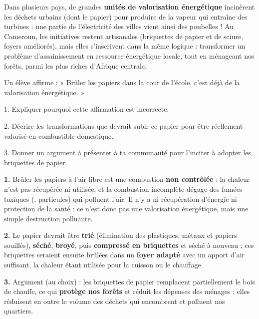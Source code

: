 \documentclass[11pt]{article}
\begin{document}
\begin{savaistu}
Dans plusieurs pays, de grandes \textbf{unités de valorisation énergétique} incinèrent les déchets urbains (dont le papier) pour produire de la vapeur qui entraîne des turbines : une partie de l'électricité des villes vient ainsi des poubelles ! Au Cameroun, les initiatives restent artisanales (briquettes de papier et de sciure, foyers améliorés), mais elles s'inscrivent dans la même logique : transformer un problème d'assainissement en ressource énergétique locale, tout en ménageant nos forêts, parmi les plus riches d'Afrique centrale.
\end{savaistu}

\begin{exercice}
Un élève affirme : « Brûler les papiers dans la cour de l'école, c'est déjà de la valorisation énergétique. »

1. Expliquer pourquoi cette affirmation est incorrecte.

2. Décrire les transformations que devrait subir ce papier pour être réellement valorisé en combustible domestique.

3. Donner un argument à présenter à ta communauté pour l'inciter à adopter les briquettes de papier.
\end{exercice}

\begin{corrige}
\textbf{1.} Brûler les papiers à l'air libre est une combustion \textbf{non contrôlée} : la chaleur n'est pas récupérée ni utilisée, et la combustion incomplète dégage des fumées toxiques (, particules) qui polluent l'air. Il n'y a ni récupération d'énergie ni protection de la santé : ce n'est donc pas une valorisation énergétique, mais une simple destruction polluante.

\textbf{2.} Le papier devrait être \textbf{trié} (élimination des plastiques, métaux et papiers souillés), \textbf{séché}, \textbf{broyé}, puis \textbf{compressé en briquettes} et séché à nouveau ; ces briquettes seraient ensuite brûlées dans un \textbf{foyer adapté} avec un apport d'air suffisant, la chaleur étant utilisée pour la cuisson ou le chauffage.

\textbf{3.} Argument (au choix) : les briquettes de papier remplacent partiellement le bois de chauffe, ce qui \textbf{protège nos forêts} et réduit les dépenses des ménages ; elles réduisent en outre le volume des déchets qui encombrent et polluent nos quartiers.
\end{corrige}
\end{document}
